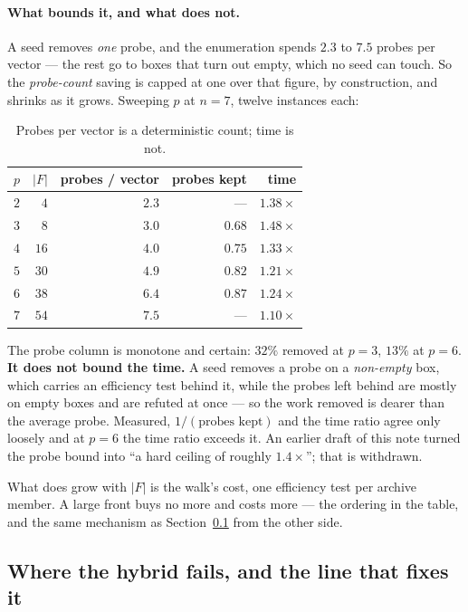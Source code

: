 \documentclass[11pt,a4paper]{article}
\begin{document}
\paragraph{What bounds it, and what does not.}  A seed removes \emph{one}
probe, and the enumeration spends $2.3$ to $7.5$ probes per vector --- the rest
go to boxes that turn out empty, which no seed can touch.  So the
\emph{probe-count} saving is capped at one over that figure, by construction,
and shrinks as it grows.  Sweeping $p$ at $n=7$, twelve instances each:

\begin{table}[h]
\centering
\caption{Probes per vector is a deterministic count; time is not.}
\begin{tabular}{crrrr}
\toprule
$p$ & $|F|$ & probes / vector & probes kept & time \\
\midrule
$2$ & $4$  & $2.3$ & ---    & $1.38\times$ \\
$3$ & $8$  & $3.0$ & $0.68$ & $1.48\times$ \\
$4$ & $16$ & $4.0$ & $0.75$ & $1.33\times$ \\
$5$ & $30$ & $4.9$ & $0.82$ & $1.21\times$ \\
$6$ & $38$ & $6.4$ & $0.87$ & $1.24\times$ \\
$7$ & $54$ & $7.5$ & ---    & $1.10\times$ \\
\bottomrule
\end{tabular}
\end{table}

\noindent
The probe column is monotone and certain: $32\%$ removed at $p=3$, $13\%$ at
$p=6$.  \textbf{It does not bound the time.}  A seed removes a probe on a
\emph{non-empty} box, which carries an efficiency test behind it, while the
probes left behind are mostly on empty boxes and are refuted at once --- so the
work removed is dearer than the average probe.  Measured,
$1/(\text{probes kept})$ and the time ratio agree only loosely and at $p=6$ the
time ratio exceeds it.  An earlier draft of this note turned the probe bound
into ``a hard ceiling of roughly $1.4\times$''; that is withdrawn.

What does grow with $|F|$ is the walk's cost, one efficiency test per archive
member.  A large front buys no more and costs more --- the ordering in the
table, and the same mechanism as Section~\ref{sec:cover} from the other side.

\subsection{Where the hybrid fails, and the line that fixes it}
\label{sec:cover}
\end{document}
